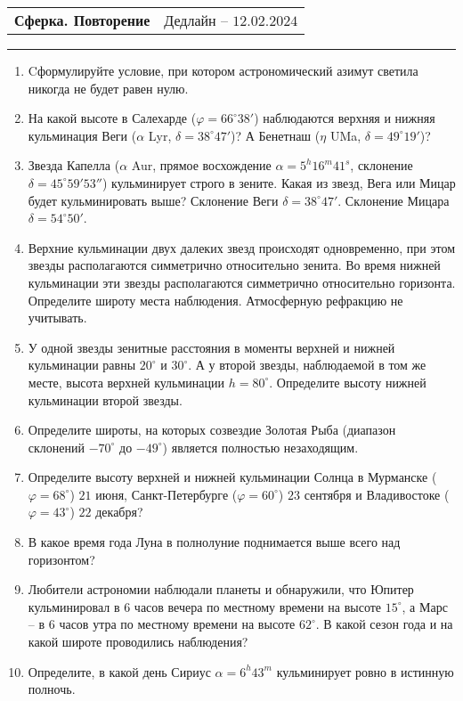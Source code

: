 \documentclass[12pt]{article}
\begin{document}
 \begin{tabularx}{\textwidth}{Xr}
  {\Large \textbf{Сферка. Повторение}} & Дедлайн -- $12.02.2024$ \\
 \end{tabularx}
 \noindent\rule{\textwidth}{0.4pt}
 \begin{enumerate}
        \item Cформулируйте условие, при котором астрономический азимут светила никогда не будет равен нулю.
        \item На какой высоте в Салехарде ($\varphi = 66^{\circ} 38'$) наблюдаются верхняя и нижняя кульминация Веги ($\alpha$ Lyr, $\delta=38^{\circ} 47'$)? А Бенетнаш ($\eta$ UMa, $\delta =49^{\circ} 19'$)?
        \item Звезда Капелла ($\alpha$ Aur, прямое восхождение $\alpha=5^h 16^m 41^s$, склонение $\delta=45^{\circ}59'53''$) кульминирует строго в зените. Какая из звезд, Вега или Мицар будет кульминировать выше? Склонение Веги $\delta=38^{\circ} 47'$. Склонение Мицара $\delta=54^{\circ}50'$.
        \item Верхние кульминации двух далеких звезд происходят одновременно, при этом звезды располагаются симметрично относительно зенита. Во время нижней кульминации эти звезды располагаются симметрично относительно горизонта. Определите широту места наблюдения. Атмосферную рефракцию не учитывать.
        \item У одной звезды зенитные расстояния в моменты верхней и нижней кульминации равны $20^{\circ}$ и $30^{\circ}$. А у второй звезды, наблюдаемой в том же месте, высота верхней кульминации $h=80^{\circ}$. Определите высоту нижней кульминации второй звезды.
        \item Определите широты, на которых созвездие Золотая Рыба (диапазон склонений $-70^{\circ}$ до $-49^{\circ}$) является полностью незаходящим.
        \item Определите высоту верхней и нижней кульминации Солнца в Мурманске ($\varphi=68^{\circ}$) $21$ июня, Санкт-Петербурге ($\varphi=60^{\circ}$) $23$ сентября и Владивостоке ($\varphi=43^{\circ}$) $22$ декабря?
        \item В какое время года Луна в полнолуние поднимается выше всего над горизонтом?
        \item Любители астрономии наблюдали планеты и обнаружили, что Юпитер кульминировал в $6$ часов вечера по местному времени на высоте $15^{\circ}$, а Марс – в $6$ часов утра по местному времени на высоте $62^{\circ}$. В какой сезон года и на какой широте проводились наблюдения?
        \item Определите, в какой день Сириус $\alpha=6^h 43^m$ кульминирует ровно в истинную полночь.
 \end{enumerate}
\end{document}

